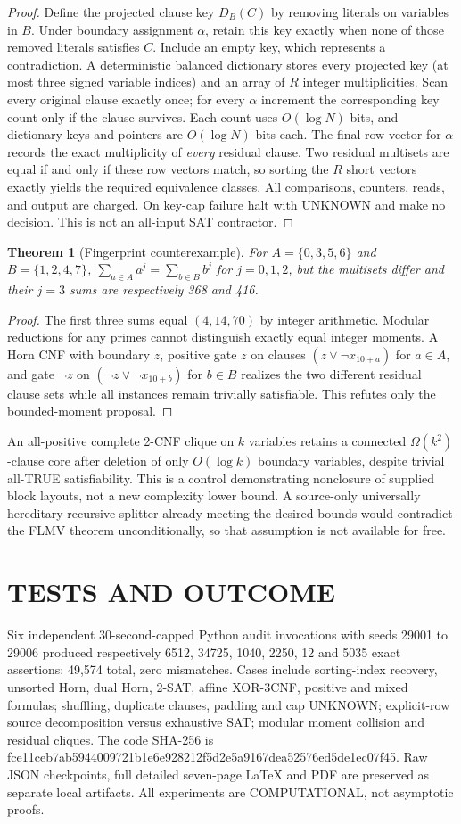 \documentclass{article}
\newtheorem{theorem}{Theorem}
\begin{document}
\begin{proof}
Define the projected clause key $D_B(C)$ by removing literals on variables in $B$. Under boundary assignment $\alpha$, retain this key exactly when none of those removed literals satisfies $C$. Include an empty key, which represents a contradiction. A deterministic balanced dictionary stores every projected key (at most three signed variable indices) and an array of $R$ integer multiplicities. Scan every original clause exactly once; for every $\alpha$ increment the corresponding key count only if the clause survives. Each count uses $O(\log N)$ bits, and dictionary keys and pointers are $O(\log N)$ bits each. The final row vector for $\alpha$ records the exact multiplicity of \emph{every} residual clause. Two residual multisets are equal if and only if these row vectors match, so sorting the $R$ short vectors exactly yields the required equivalence classes. All comparisons, counters, reads, and output are charged. On key-cap failure halt with UNKNOWN and make no decision. This is not an all-input SAT contractor.
\end{proof}
\begin{theorem}[Fingerprint counterexample]
For $A=\{0,3,5,6\}$ and $B=\{1,2,4,7\}$, $\sum_{a\in A}a^j=\sum_{b\in B}b^j$ for $j=0,1,2$, but the multisets differ and their $j=3$ sums are respectively 368 and 416.
\end{theorem}
\begin{proof}
The first three sums equal $(4,14,70)$ by integer arithmetic. Modular reductions for any primes cannot distinguish exactly equal integer moments. A Horn CNF with boundary $z$, positive gate $z$ on clauses $(z\lor\neg x_{10+a})$ for $a\in A$, and gate $\neg z$ on $(\neg z\lor\neg x_{10+b})$ for $b\in B$ realizes the two different residual clause sets while all instances remain trivially satisfiable. This refutes only the bounded-moment proposal.
\end{proof}
An all-positive complete 2-CNF clique on $k$ variables retains a connected $\Omega(k^2)$-clause core after deletion of only $O(\log k)$ boundary variables, despite trivial all-TRUE satisfiability. This is a control demonstrating nonclosure of supplied block layouts, not a new complexity lower bound. A source-only universally hereditary recursive splitter already meeting the desired bounds would contradict the FLMV theorem unconditionally, so that assumption is not available for free.
\section{TESTS AND OUTCOME}
Six independent 30-second-capped Python audit invocations with seeds 29001 to 29006 produced respectively 6512, 34725, 1040, 2250, 12 and 5035 exact assertions: 49,574 total, zero mismatches. Cases include sorting-index recovery, unsorted Horn, dual Horn, 2-SAT, affine XOR-3CNF, positive and mixed formulas; shuffling, duplicate clauses, padding and cap UNKNOWN; explicit-row source decomposition versus exhaustive SAT; modular moment collision and residual cliques. The code SHA-256 is fce11ceb7ab5944009721b1e6e928212f5d2e5a9167dea52576ed5de1ec07f45. Raw JSON checkpoints, full detailed seven-page LaTeX and PDF are preserved as separate local artifacts. All experiments are COMPUTATIONAL, not asymptotic proofs.
\end{document}
